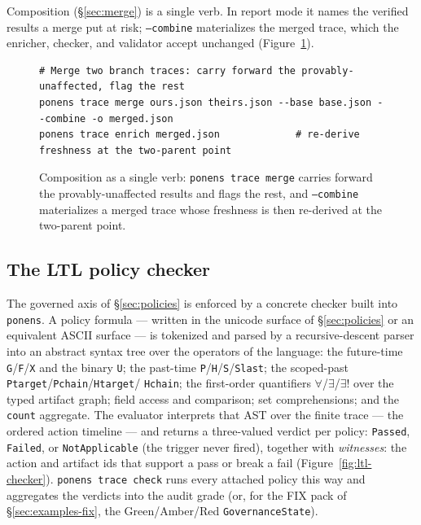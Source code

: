 \documentclass[11pt]{article}
\newcommand{\codeus}{\textunderscore\penalty100\relax}
\newcommand{\code}[1]{\texttt{\let\_\codeus #1}}
\begin{document}
Composition (\S\ref{sec:merge}) is a single verb. In report mode it names the verified results a merge put
at risk; \code{--combine} materializes the merged trace, which the enricher, checker, and validator accept
unchanged (Figure~\ref{fig:core-cli-merge}).

\begin{figure}[H]
\begin{lstlisting}[language=PonensCLI]
# Merge two branch traces: carry forward the provably-unaffected, flag the rest
ponens trace merge ours.json theirs.json --base base.json --combine -o merged.json
ponens trace enrich merged.json             # re-derive freshness at the two-parent point
\end{lstlisting}
\caption{Composition as a single verb: \code{ponens trace merge} carries forward the provably-unaffected results and flags the rest, and \code{--combine} materializes a merged trace whose freshness is then re-derived at the two-parent point.}
\label{fig:core-cli-merge}
\end{figure}

\subsection{The LTL policy checker}\label{sec:impl-ltl}

The governed axis of \S\ref{sec:policies} is enforced by a concrete checker built into \code{ponens}. A
policy formula --- written in the unicode surface of \S\ref{sec:policies} or an equivalent ASCII surface ---
is tokenized and parsed by a recursive-descent parser into an abstract syntax tree over the operators of the
language: the future-time \code{G}/\code{F}/\code{X} and the binary \code{U}; the past-time
\code{P}/\code{H}/\code{S}/\code{S\_last}; the scoped-past \code{P\_target}/\code{P\_chain}/\code{H\_target}/%
\code{H\_chain}; the first-order quantifiers $\forall$/$\exists$/$\exists!$ over the typed artifact graph;
field access and comparison; set comprehensions; and the \code{count} aggregate. The evaluator interprets
that AST over the finite trace --- the ordered action timeline --- and returns a three-valued verdict per
policy: \code{Passed}, \code{Failed}, or \code{NotApplicable} (the trigger never fired), together with
\emph{witnesses}: the action and artifact ids that support a pass or break a fail
(Figure~\ref{fig:ltl-checker}). \code{ponens trace check} runs every attached policy this way and aggregates
the verdicts into the audit grade (or, for the FIX pack of \S\ref{sec:examples-fix}, the Green/Amber/Red
\code{GovernanceState}).
\end{document}
